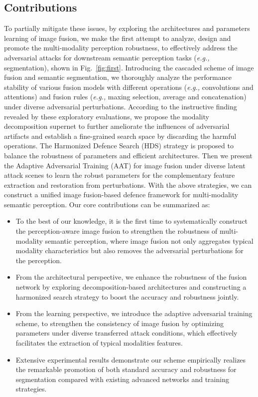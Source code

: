 \documentclass[sigconf]{acmart}
\begin{document}
\subsection{Contributions}
To partially mitigate these issues, by exploring the architectures and parameters learning of image fusion, we make the first attempt to analyze, design and promote the multi-modality perception robustness, to effectively address the adversarial attacks for downstream semantic perception tasks (\textit{e.g.,} segmentation), shown in Fig.~\ref{fig:first}. Introducing the cascaded scheme of image fusion and semantic segmentation,
we thoroughly analyze the performance stability of various fusion models with different operations (\textit{e.g.,} convolutions and attentions) and fusion rules (\textit{e.g.,} maxing selection, average and concatenation) under diverse adversarial perturbations. According to  the instructive finding revealed by these exploratory evaluations, we propose the modality decomposition supernet to further ameliorate the influences of adversarial artifacts and establish a fine-grained search space by discarding the harmful operations. The Harmonized Defence Search (HDS) strategy is proposed to balance the robustness of parameters and efficient architectures. Then we present the Adaptive 
Adversarial Training (AAT) for image fusion under diverse latent attack scenes to learn the robust parameters for the complementary feature extraction and restoration from perturbations.
With the above strategies, we can construct a unified image fusion-based defence framework for multi-modality semantic perception.
Our core contributions can be summarized as:
\begin{itemize}
	\item  To the best of our knowledge, it is the first time to systematically construct the perception-aware image fusion to strengthen the robustness of multi-modality semantic perception, where image fusion not only aggregates typical modality characteristics but also removes the adversarial perturbations for the perception.
	
	\item From the architectural perspective, we enhance the robustness of the fusion network by exploring decomposition-based architectures and constructing a harmonized search strategy to boost the accuracy and robustness jointly.
	
	\item From the learning perspective, we introduce the adaptive adversarial training scheme, to strengthen the consistency of image fusion by optimizing parameters under diverse transferred attack conditions, which effectively facilitates the extraction of typical modalities features.
	
	\item Extensive experimental results demonstrate our scheme empirically realizes the remarkable promotion of both standard accuracy and robustness for  segmentation compared with existing advanced networks and training strategies.  
\end{itemize}
\end{document}
